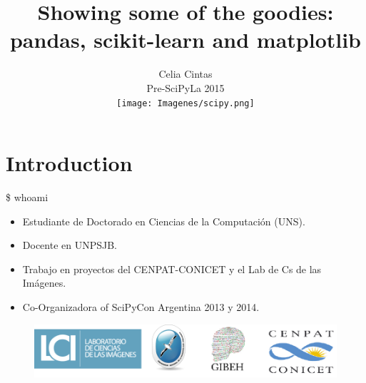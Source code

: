 \documentclass[bigger]{beamer}
\begin{document}
\title{Showing some of the goodies: pandas, scikit-learn and matplotlib\\[0.5cm]}
\subtitle{Celia Cintas \\[0.2cm] Pre-SciPyLa 2015 \\[0.3cm]
\texttt{[image: Imagenes/scipy.png]}}
\date{}
\begin{frame}
\titlepage
\end{frame}
\section{Introduction}
\begin{frame}{\$ whoami}
\begin{itemize}
    \item Estudiante de Doctorado en Ciencias de la Computación (UNS).
    \item Docente en UNPSJB.
    \item Trabajo en proyectos del CENPAT-CONICET y el Lab de Cs de las Imágenes.
    \item Co-Organizadora of SciPyCon Argentina 2013 y 2014.
\end{itemize}
\begin{figure}
        \includegraphics[scale = 0.25]{Imagenes/uni.png}
\end{figure}
\end{frame}
\end{document}

